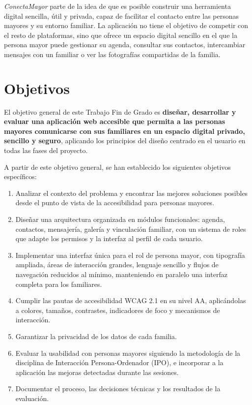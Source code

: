 \emph{ConectaMayor} parte de la idea de que es posible construir una herramienta
digital sencilla, útil y privada, capaz de facilitar el contacto entre
las personas mayores y su entorno familiar. La aplicación no tiene el objetivo de competir con el resto de plataformas, sino que ofrece un espacio digital sencillo
en el que la persona mayor puede gestionar su agenda, consultar sus contactos,
intercambiar mensajes con un familiar o ver las fotografías compartidas de la familia.

\section{Objetivos\label{SEC:OBJETIVOS}}

El objetivo general de este Trabajo Fin de Grado es \textbf{diseñar, desarrollar
y evaluar una aplicación web accesible que permita a las personas mayores
comunicarse con sus familiares en un espacio digital privado, sencillo y seguro},
aplicando los principios del diseño centrado en el usuario en todas las fases del
proyecto.

A partir de este objetivo general, se han establecido los siguientes objetivos
específicos:

\begin{enumerate}
  \item Analizar el contexto del problema y encontrar las mejores soluciones posibles desde el punto de vista de la accesibilidad para
  personas mayores.

  \item Diseñar una arquitectura organizada en módulos funcionales: agenda, contactos, mensajería, galería y vinculación familiar, con un sistema de roles que adapte los permisos y la interfaz al perfil de cada
  usuario.

  \item Implementar una interfaz única para el rol de persona mayor, con
  tipografía ampliada, áreas de interacción grandes, lenguaje sencillo y flujos
  de navegación reducidos al mínimo, manteniendo en paralelo una interfaz
  completa para los familiares.

  \item Cumplir las pautas de accesibilidad WCAG 2.1 en su nivel AA, aplicándolas
  a colores, tamaños, contrastes, indicadores de foco y mecanismos de interacción.

  \item Garantizar la privacidad de los datos de cada familia.

  \item Evaluar la usabilidad con personas mayores siguiendo la metodología de la disciplina de Interacción Persona-Ordenador (IPO), e incorporar a la aplicación las mejoras detectadas durante las sesiones.

  \item Documentar el proceso, las decisiones técnicas y los resultados de la
  evaluación.
\end{enumerate}

